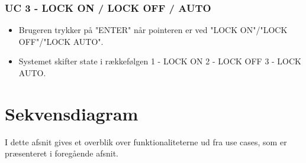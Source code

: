 \subsubsection{UC 3 - LOCK ON / LOCK OFF / AUTO}

\begin{itemize}
	\item Brugeren trykker på "ENTER" når pointeren er ved "LOCK ON"/"LOCK OFF"/"LOCK AUTO".
	\item Systemet skifter state i rækkefølgen 1 - LOCK ON 2 - LOCK OFF 3 - LOCK AUTO.
\end{itemize}

\newpage
\section{Sekvensdiagram}
I dette afsnit gives et overblik over funktionaliteterne ud fra use cases, som er præsenteret i foregående afsnit. 

